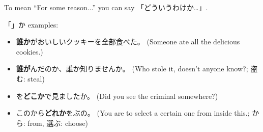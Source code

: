 \documentclass[../nihongo-gakushuu-kyouzai.tex]{subfiles}
\begin{document}
\begin{table}[h]
\centering
{}
\caption{Question words and their modified variants. Treat these all as normal nouns. $^\dagger$: 誰も is usually used in negative sentences to mean nobody can do the verb, and to express the positive universal everybody we typically use [さん]; $^\ddagger$: 何も is used exclusively in negative sentences.}
\label{tbl:question-word-modifications}
\end{table}

To mean ``For some reason...'' you can say 「どういうわけか\dots」.

「」か examples:
\begin{itemize}
    \item \textbf{誰か}がおいしいクッキーを全部食べた。 (Someone ate all the delicious cookies.)
    \item \textbf{誰が}んだのか、誰か知りませんか。 (Who stole it, doesn't anyone know?; 盗む: steal)
    \item {}を\textbf{どこか}で見ましたか。 (Did you see the criminal somewhere?)
    \item このから\textbf{どれか}をぶの。 (You are to select a certain one from inside this.; から: from, 選ぶ: choose)
\end{itemize}
\end{document}
